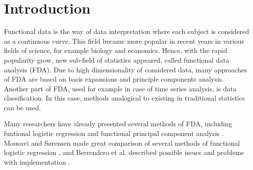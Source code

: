 \documentclass[energies,article,submit,pdftex,moreauthors]{Definitions/mdpi}
\begin{document}




\section{Introduction}

Functional data is the way of data interpretation where each subject is considered as a continuous curve. This field became more popular in recent years in various fields of science, for example biology and economics. Hence, with the rapid popularity grow, new sub-field of statistics appeared, called functional data analysis (FDA). Due to high dimensionality of considered data, many approaches of FDA are based on basis expansions and principle components analysis. Another part of FDA, used for example in case of time series analysis, is data classification. In this case, methods analogical to existing in traditional statistics can be used. 

Many researchers have already presented several methods of FDA, including funtional logistic regression \cite{ramsay-logreg, ramsay-logreg2} and functional principal component analysis \cite{besse-pca, pezzulini-pca}. Mousavi and Sørensen made great comparison of several methods of functional logistic regression \cite{logreg-comparison}, and Berrendero et al. described possible issues and problems with implementation \cite{logreg-issues}.
\end{document}
